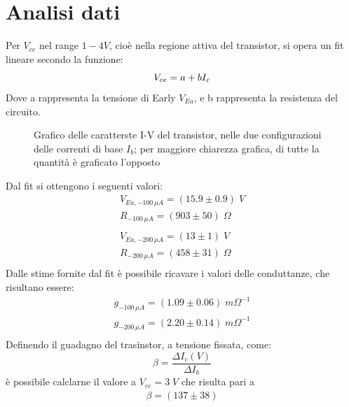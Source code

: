\documentclass{article}
\begin{document}
\section{Analisi dati}

Per $V_{ce}$ nel range $1-4 V$, cioè nella regione attiva del transistor, si opera un fit lineare secondo la funzione:
\begin{equation}
    V_{ce} = a + b I_c\\
\end{equation}
Dove a rappresenta la tensione di Early $V_{Ea}$, e b rappresenta la resistenza del circuito.\\
\begin{figure}[H]
    \begin{center}
        \scalebox{0.7}{}
        \caption{\centering\label{fig:multigraph}Grafico delle caratterste I-V del transistor, nelle due configurazioni delle correnti di base $I_b$; per maggiore chiarezza grafica, di tutte la quantità è graficato l'opposto}
    \end{center}
\end{figure}
\noindent Dal fit si ottengono i seguenti valori:
\begin{equation}
    \begin{aligned}
        V_{Ea,-100 \,\mu A}=(15.9\pm 0.9) \;V  \\
        R_{-100 \,\mu A}=(903 \pm 50) \;\Omega \\
        \\
        V_{Ea,-200 \,\mu A}=(13\pm 1) \;V      \\
        R_{-200 \,\mu A}=(458 \pm 31) \;\Omega \\
    \end{aligned}
\end{equation}
Dalle stime fornite dal fit è possibile ricavare i valori delle conduttanze, che risultano essere:
\begin{equation}
    \begin{aligned}
        g_{-100 \,\mu A}=(1.09 \pm 0.06) \;m\Omega^{-1} \\
        g_{-200 \,\mu A}=(2.20 \pm 0.14) \;m\Omega^{-1} \\
    \end{aligned}
\end{equation}
Definendo il guadagno del trasinstor, a tensione fissata, come:
\begin{equation}
    \beta= \frac{\Delta I_c(V)}{\Delta I_b}
\end{equation}
è possibile calclarne il valore a $V_{ce}=3 \;V$ che risulta pari a
\begin{equation}
    \begin{aligned}
        \beta=(137\pm38)
    \end{aligned}
\end{equation}
\end{document}
